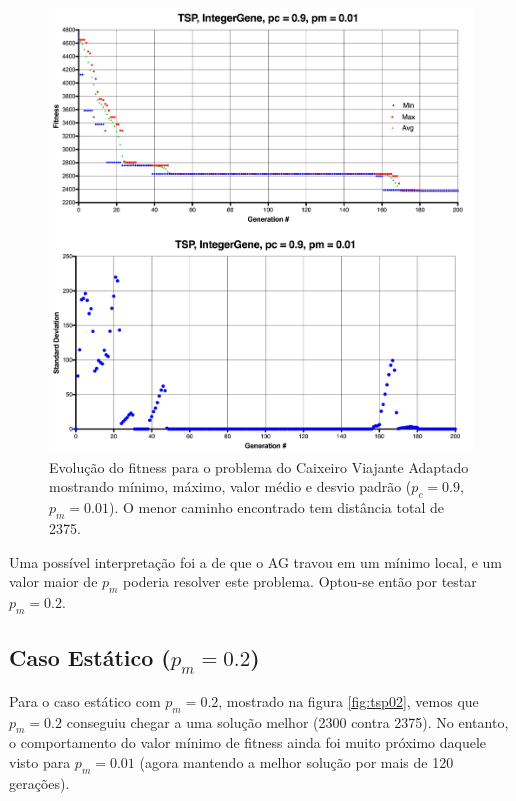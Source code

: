 \begin{figure}[ht!]
    \centering \includegraphics[width=1.0\textwidth]{tsp_001.jpg}
    \caption{Evolução do fitness para o problema do Caixeiro Viajante Adaptado mostrando mínimo, máximo, valor médio e desvio padrão ($p_c=0.9$, $p_m=0.01$). O menor caminho encontrado tem distância total de 2375.}
    \label{fig:tsp001}
\end{figure}

Uma possível interpretação foi a de que o AG travou em um mínimo local, e um valor maior de $p_m$ poderia resolver este problema. Optou-se então por testar $p_m = 0.2$.

\subsection{Caso Estático ($p_m = 0.2$)}

Para o caso estático com $p_m = 0.2$, mostrado na figura \ref{fig:tsp02}, vemos que $p_m = 0.2$ conseguiu chegar a uma solução melhor (2300 contra 2375). No entanto, o comportamento do valor mínimo de fitness ainda foi muito próximo daquele visto para $p_m = 0.01$ (agora mantendo a melhor solução por mais de 120 gerações). 

